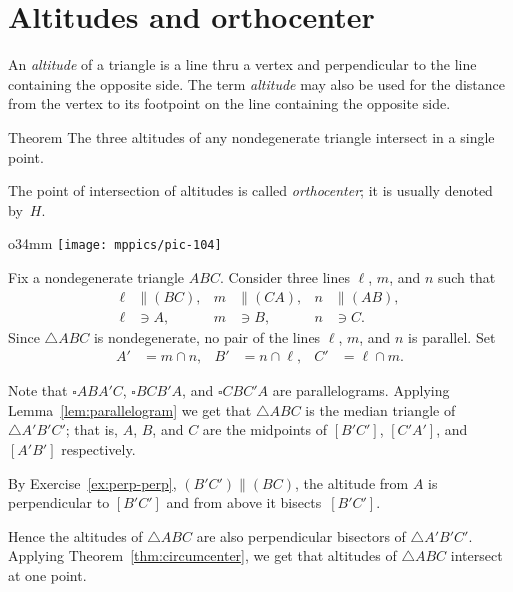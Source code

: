 \section{Altitudes and orthocenter}

An \emph{altitude} of a triangle is a line thru a vertex and perpendicular to the line containing the opposite side.
The term \emph{altitude} may also be used for the distance from the vertex to its footpoint on the line containing the opposite side.

\begin{thm}{Theorem}\label{thm:orthocenter}
The three altitudes of any nondegenerate triangle intersect in a single point.
\end{thm}

The point of intersection of altitudes is called \emph{orthocenter}; 
it is usually denoted by~$H$.

{

\begin{wrapfigure}{o}{34mm}
\vskip-4mm
\centering
\texttt{[image: mppics/pic-104]}
\end{wrapfigure}

Fix a nondegenerate triangle $A B C$.
Consider three lines $\ell$, $m$, and $n$
such that 
\begin{align*}
\ell&\parallel(BC),
&
m&\parallel(CA),
&
n&\parallel(AB),
\\
\ell&\ni A,
&
m&\ni B,
&
n&\ni C.
\end{align*}
Since $\triangle A B C$ is nondegenerate,
no pair of the lines $\ell$, $m$, and $n$ is parallel.
Set 
\begin{align*}
A'&=m\cap n,
&
B'&=n\cap \ell,
&
C'&=\ell\cap m.
\end{align*}

}

Note that $\square A B A' C$, $\square B C B' A$, and $\square C B C' A$ are parallelograms.
Applying Lemma~\ref{lem:parallelogram} we get that $\triangle ABC$ is the median triangle of $\triangle A' B' C'$;
that is, $A$, $B$, and $C$ are the midpoints of $[B' C']$, $[C' A']$, and $[A' B']$ respectively.

By Exercise~\ref{ex:perp-perp},
$(B' C')\parallel (BC)$,
the altitude from $A$ is perpendicular to $[B' C']$ 
and from above it bisects~$[B' C']$.

Hence the altitudes of $\triangle A B C$ 
are also perpendicular bisectors of $\triangle A' B' C'$.
Applying Theorem~\ref{thm:circumcenter}, we get that altitudes of $\triangle ABC$ intersect at one point.
\qeds

